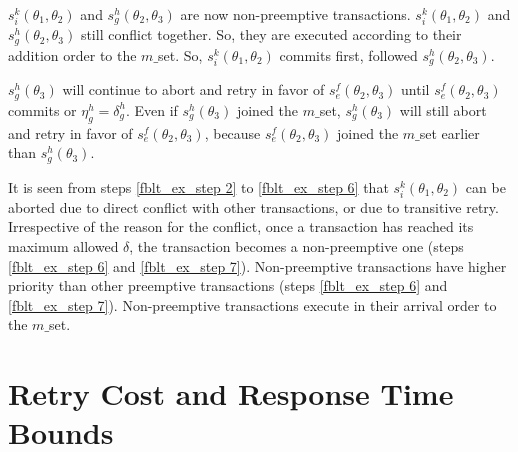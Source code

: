 \documentclass[conference]{IEEEtran}
\begin{document}
\begin{compactenum}
%
\item $s_{i}^{k}(\theta_{1},\theta_{2})$ and $s_{g}^{h}(\theta_{2},\theta_{3})$
are now non-preemptive transactions. $s_{i}^{k}(\theta_{1},\theta_{2})$
and $s_{g}^{h}(\theta_{2},\theta_{3})$ still conflict together. So,
they are executed according to their addition order to the $m\_$set.
So, $s_{i}^{k}(\theta_{1},\theta_{2})$ commits first, followed $s_{g}^{h}(\theta_{2},\theta_{3})$.
\item $s_{g}^{h}(\theta_{3})$ will continue to abort and retry in favor
of $s_{e}^{f}(\theta_{2},\theta_{3})$ until $s_{e}^{f}(\theta_{2},\theta_{3})$
commits or $\eta_{g}^{h}=\delta_{g}^{h}$. Even if $s_{g}^{h}(\theta_{3})$
joined the $m\_$set, $s_{g}^{h}(\theta_{3})$ will still abort and retry
in favor of $s_{e}^{f}(\theta_{2},\theta_{3})$, because $s_{e}^{f}(\theta_{2},\theta_{3})$ joined the $m\_$set earlier than $s_{g}^{h}(\theta_{3})$.
\end{compactenum}

It is seen from steps \ref{fblt_ex_step 2} to \ref{fblt_ex_step 6}
that $s_{i}^{k}(\theta_{1},\theta_{2})$ can be aborted due to direct
conflict with other transactions, or due to transitive retry. Irrespective of 
the reason for the conflict, once a transaction has reached its maximum
allowed $\delta$, the transaction becomes a non-preemptive one
(steps \ref{fblt_ex_step 6} and \ref{fblt_ex_step 7}). Non-preemptive
transactions have higher priority than other preemptive transactions
(steps \ref{fblt_ex_step 6} and \ref{fblt_ex_step 7}). Non-preemptive
transactions execute in their arrival order to the $m\_$set.


\section{Retry Cost and Response Time Bounds}\label{fblt rc}
\end{document}
